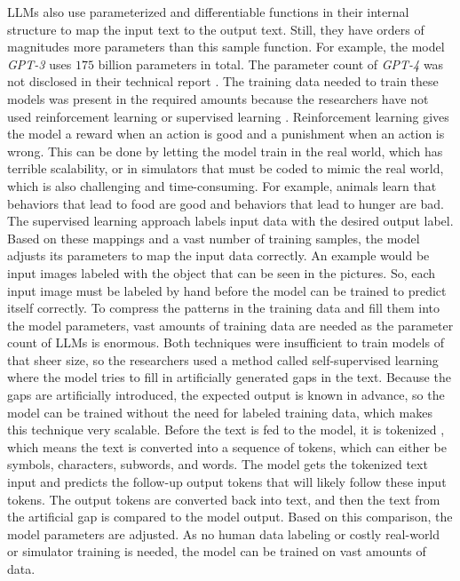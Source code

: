 \documentclass[draft,final]{thesisclass} %
\begin{document}
\gls{LLM}s also use parameterized and differentiable functions in their internal structure to map the input text to the output text. Still, they have orders of magnitudes more parameters than this sample function.
For example, the model \textit{GPT-3} uses $175$ billion parameters \parencite[1]{gpt3} in total. The parameter count of \textit{GPT-4} was not disclosed in their technical report \parencite{gpt4}.
The training data needed to train these models was present in the required amounts because the researchers have not used reinforcement learning \parencite{rl_bible} or supervised learning \parencite[3]{sl_bible}.
Reinforcement learning gives the model a reward when an action is good and a punishment when an action is wrong. This can be done by letting the model train in the real world, which has terrible scalability, or in simulators that must be coded to mimic the real world, which is also challenging and time-consuming.
For example, animals learn that behaviors that lead to food are good and behaviors that lead to hunger are bad.
The supervised learning approach labels input data with the desired output label. Based on these mappings and a vast number of training samples, the model adjusts its parameters to map the input data correctly.
An example would be input images labeled with the object that can be seen in the pictures. So, each input image must be labeled by hand before the model can be trained to predict itself correctly.
To compress the patterns in the training data and fill them into the model parameters, vast amounts of training data are needed as the parameter count of \gls{LLM}s is enormous.
Both techniques were insufficient to train models of that sheer size, so the researchers used a method called self-supervised learning \parencite[7]{llm_literature_review} where the model tries to fill in artificially generated gaps in the text.
Because the gaps are artificially introduced, the expected output is known in advance, so the model can be trained without the need for labeled training data, which makes this technique very scalable.
Before the text is fed to the model, it is tokenized \parencite[4]{llm_literature_review}, which means the text is converted into a sequence of tokens, which can either be symbols, characters, subwords, and words.
The model gets the tokenized text input and predicts the follow-up output tokens that will likely follow these input tokens. The output tokens are converted back into text, and then the text from the artificial gap is compared to the model output.
Based on this comparison, the model parameters are adjusted. As no human data labeling or costly real-world or simulator training is needed, the model can be trained on vast amounts of data.
\end{document}

